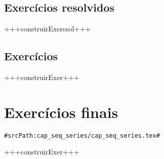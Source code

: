 \subsection*{Exercícios resolvidos}

+++construirExeresol+++

\subsection*{Exercícios}

+++construirExer+++

\section{Exercícios finais}
\verb+#srcPath:cap_seq_series/cap_seq_series.tex#+


+++construirExer+++



